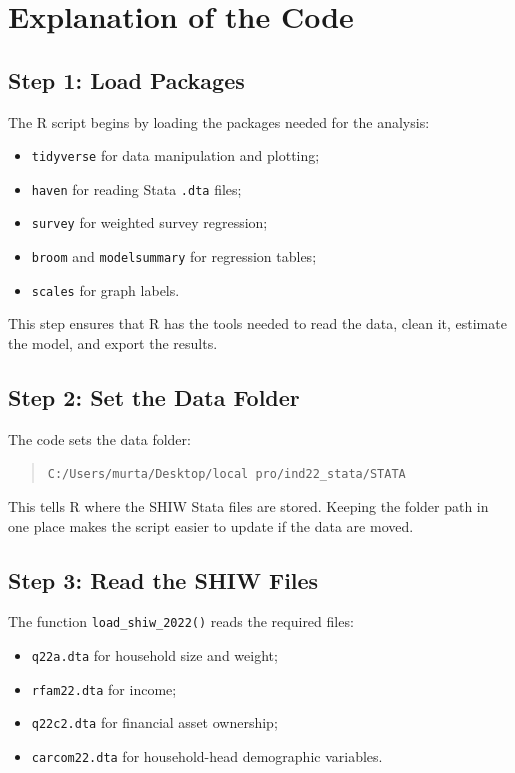 \documentclass[12pt]{article}
\begin{document}
\section{Explanation of the Code}

\subsection{Step 1: Load Packages}

The R script begins by loading the packages needed for the analysis:

\begin{itemize}[leftmargin=*]
    \item \texttt{tidyverse} for data manipulation and plotting;
    \item \texttt{haven} for reading Stata \texttt{.dta} files;
    \item \texttt{survey} for weighted survey regression;
    \item \texttt{broom} and \texttt{modelsummary} for regression tables;
    \item \texttt{scales} for graph labels.
\end{itemize}

This step ensures that R has the tools needed to read the data, clean it, estimate the model, and export the results.

\subsection{Step 2: Set the Data Folder}

The code sets the data folder:

\begin{quote}
\texttt{C:/Users/murta/Desktop/local pro/ind22\_stata/STATA}
\end{quote}

This tells R where the SHIW Stata files are stored. Keeping the folder path in one place makes the script easier to update if the data are moved.

\subsection{Step 3: Read the SHIW Files}

The function \texttt{load\_shiw\_2022()} reads the required files:

\begin{itemize}[leftmargin=*]
    \item \texttt{q22a.dta} for household size and weight;
    \item \texttt{rfam22.dta} for income;
    \item \texttt{q22c2.dta} for financial asset ownership;
    \item \texttt{carcom22.dta} for household-head demographic variables.
\end{itemize}
\end{document}
